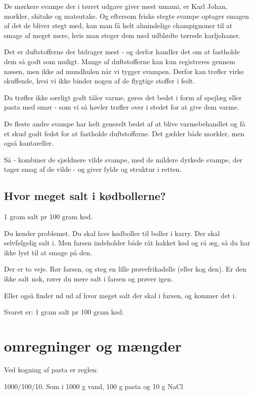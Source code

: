 \documentclass[
]{book}
\begin{document}
De mørkere svampe der i tørret udgave giver mest umami, er Karl Johan, morkler,
shitake og matsutake. Og eftersom friske stegte svampe optager smagen af det
de bliver stegt med, kan man få helt almindelige champignoner til at smage af
meget mere, hvis man steger dem med udblødte tørrede karljohaner.

Det er duftstofferne der bidrager mest - og derfor handler det om at fastholde
dem så godt som muligt. Mange af duftstofferne kan kun registreres gennem næsen,
men ikke ad mundhulen når vi tygger svampen. Derfor kan trøfler virke skuffende,
hvsi vi ikke binder nogen af de flygtige stoffer i fedt.

Da trøfler ikke særligt godt tåler varme, gøres det bedst i form af spejlæg eller
pasta med smør - som vi så høvler trøfler over i stedet for at give dem varme.

De fleste andre svampe har helt generelt bedst af at blive varmebehandlet og
få et skud godt fedst for at fastholde duftstofferne. Det gælder både morkler,
men også kantareller.

Så - kombiner de sjældnere vilde svampe, med de mildere dyrkede svampe,
der tager smag af de vilde - og giver fylde og struktur i retten.

\section{Hvor meget salt i kødbollerne?}\label{hvor-meget-salt-i-kuxf8dbollerne}

1 gram salt pr 100 gram kød.

Du kender problemet. Du skal lave kødboller til boller i karry. Der skal selvfølgelig salt i. Men farsen indeholder både råt hakket kød og rå æg, så du har ikke lyst til at smage på den.

Der er to veje. Rør farsen, og steg en lille prøvefrikadelle (eller kog den). Er den ikke salt nok, rører du mere salt i farsen og prøver igen.

Eller også finder ud ud af hvor meget salt der skal i farsen, og kommer det i.

Svaret er: 1 gram salt pr 100 gram kød.

\chapter{omregninger og mængder}\label{omregninger-og-muxe6ngder}

Ved kogning af pasta er reglen:

1000/100/10. Som i 1000 g vand, 100 g pasta og 10 g NaCl
\end{document}
